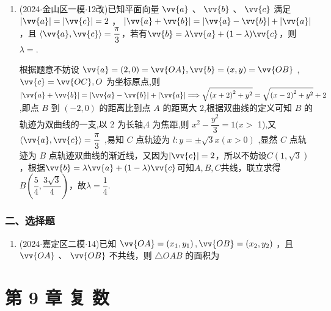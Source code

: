 \begin{enumerate}
    \item (2024$\cdot$金山区一模$\cdot$12改)已知平面向量 $\vv{a}$ 、 $\vv{b}$ 、 $\vv{c}$ 满足 $\left| \vv{a}\right| = |\vv{c}| = 2$ ， $\left| {\vv{a} + \vv{b}}\right|  = \left| {\vv{a} - \vv{b}}\right|  + \left| \vv{a}\right|$ ，且 $\langle \vv{a},\vv{c}\rangle  = \dfrac{\pi }{3}$，若有$\vv{b} = \lambda \vv{a} + (1-\lambda)\vv{c}$，则 $\lambda = $.
    \begin{jieda}
        根据题意不妨设 $\vv{a} = \left( {2,0}\right)  = \vv{OA},\vv{b} = \left( {x,y}\right)  = \vv{OB}$ , $\vv{c} = \vv{OC},O$ 为坐标原点,则 $\left| {\vv{a} + \vv{b}}\right|  = \left| {\vv{a} - \vv{b}}\right|  + \left| \vv{a}\right|  \Longrightarrow  \sqrt{{\left( x + 2\right) }^{2} + {y}^{2}} = \sqrt{{\left( x - 2\right) }^{2} + {y}^{2}} + 2$ ,即点 $B$ 到 $\left( {-2,0}\right)$ 的距离比到点 $A$ 的距离大 2,根据双曲线的定义可知 $B$ 的轨迹为双曲线的一支,以 2 为长轴,4 为焦距,则 ${x}^{2} - \dfrac{{y}^{2}}{3} = 1(x >$ 1),又 $\langle \vv{a},\vv{c}\rangle  = \dfrac{\pi }{3}$ ,易知 $C$ 点轨迹为 $l : y =  \pm  \sqrt{3}x\left( {x > 0}\right)$ ,显然 $C$ 点轨迹为 $B$ 点轨迹双曲线的渐近线，又因为$|\vv{c}| = 2$，所以不妨设$C(1, \sqrt{3})$，根据$\vv{b} = \lambda \vv{a} + (1-\lambda)\vv{c}$可知$A, B, C$共线，联立求得$B\left(\dfrac{5}{4}, \dfrac{3\sqrt{3}}{4}\right)$，故$\lambda = \dfrac{1}{4}$.
    \end{jieda}
\end{enumerate}

\subsubsection*{二、选择题}
\begin{enumerate}
    \item (2024$\cdot$嘉定区二模$\cdot$14)已知 $\vv{OA} = \left( {{x}_{1},{y}_{1}}\right) ,\vv{OB} = \left( {{x}_{2},{y}_{2}}\right)$ ，且 $\vv{OA}$ 、 $\vv{OB}$ 不共线，则 $\bigtriangleup {OAB}$ 的面积为 
\end{enumerate}

\section*{第 9 章 复 数}

